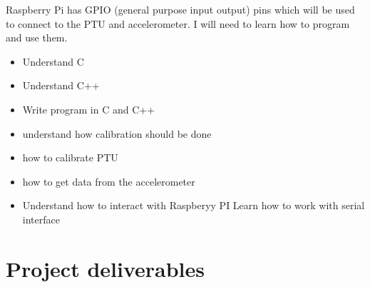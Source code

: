 \documentclass[11pt,fleqn,twoside]{article}
\begin{document}
Raspberry Pi has GPIO (general purpose input output) pins which will be used to connect to the PTU and accelerometer. I will need to learn how to program and use them.    

\begin{itemize} \itemsep1pt \parskip0pt 
\item Understand C
\item Understand C++
\item Write program in C and C++
\item understand how calibration should be done
\item how to calibrate PTU
\item how to get data from the accelerometer
\item Understand how to interact with Raspberyy  PI
Learn how to work with serial interface
\end{itemize}

\section{Project deliverables}
\end{document}
